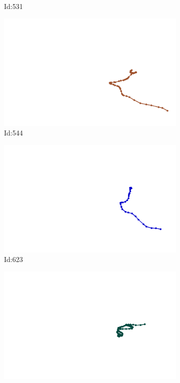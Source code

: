 \documentclass[12pt,twoside]{report}
\begin{document}
\begin{figure}
\begin{subfigure}[b]{0.20\textwidth}
\caption{Id:531}
\end{subfigure}
\begin{subfigure}[b]{0.20\textwidth}
\centering
\includegraphics[width=\textwidth]{../trajectories/544.png}
\caption{Id:544}
\end{subfigure}
\begin{subfigure}[b]{0.20\textwidth}
\centering
\includegraphics[width=\textwidth]{../trajectories/623.png}
\caption{Id:623}
\end{subfigure}
\begin{subfigure}[b]{0.20\textwidth}
\centering
\includegraphics[width=\textwidth]{../trajectories/636.png}

\end{subfigure}
\end{figure}
\end{document}
